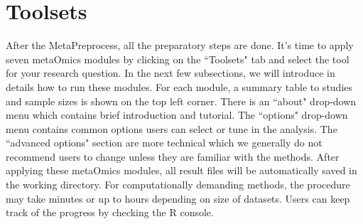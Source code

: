 \section{Toolsets}

After the MetaPreprocess,
all the preparatory steps are done. 
It's time to apply seven metaOmics modules by clicking on the ``Toolsets" tab and select the tool for your research question.
In the next few subsections, 
we will introduce in details how to run these modules.
For each module, a summary table to studies and sample sizes is shown on the top left corner. 
There is an ``about" drop-down menu which contains brief introduction and tutorial.
The ``options" drop-down menu contains common options users can select or tune in the analysis.
The ``advanced options" section are more technical which we generally do not recommend users to change unless they are familiar with the methods.
After applying these metaOmics modules, all result files will be automatically saved in the working directory.
For computationally demanding methods, the procedure may take minutes or up to hours depending on size of datasets.
Users can keep track of the progress by checking the R console.






